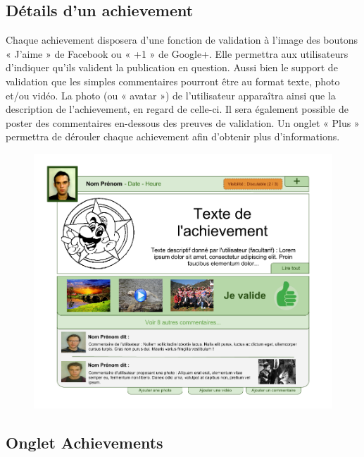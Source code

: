 \documentclass{life-fr}
\begin{document}
\newpage

\subsection{Détails d'un achievement}

Chaque achievement disposera d'une fonction de validation à l'image des boutons « J'aime » de Facebook ou « +1 » de Google+. Elle permettra aux utilisateurs d'indiquer qu'ils valident la publication en question. Aussi bien le support de validation que les simples commentaires pourront être au format texte, photo et/ou vidéo. La photo (ou « avatar ») de l'utilisateur apparaîtra ainsi que la description de l'achievement, en regard de celle-ci. Il sera également possible de poster des commentaires en-dessous des preuves de validation. Un onglet « Plus » permettra de dérouler chaque achievement afin d'obtenir plus d'informations.\\

\begin{figure}[H]
  \begin{center}
    \includegraphics[width=15cm]{img/achievement.png}
  \end{center}
\end{figure}

\subsection{Onglet Achievements}
\end{document}

